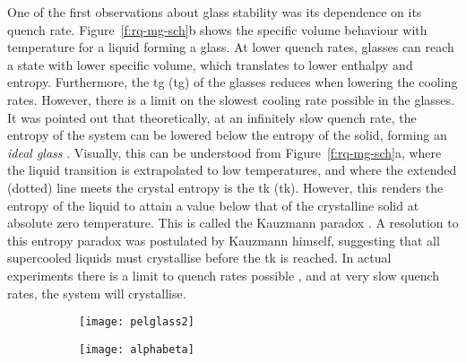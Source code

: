One of the first observations about glass stability was its dependence on its quench rate. Figure~\ref{f:rq-mg-sch}b shows the specific volume behaviour with temperature for a liquid forming a glass. At lower quench rates, glasses can reach a state with lower specific volume, which translates to lower enthalpy and entropy. Furthermore, the \glsdesc{tg} (\gls{tg}) of the glasses reduces when lowering the cooling rates. However, there is a limit on the slowest cooling rate possible in the glasses. It was pointed out that theoretically, at an infinitely slow quench rate, the entropy of the system can be lowered below the entropy of the solid, forming an \textit{ideal glass} \cite{Kauzmann1948}. Visually, this can be understood from Figure~\ref{f:rq-mg-sch}a, where the liquid transition is extrapolated to low temperatures, and where the extended (dotted) line meets the crystal entropy is the \glsdesc{tk} (\gls{tk}). However, this renders the entropy of the liquid to attain a value below that of the crystalline solid at absolute zero temperature. This is called the Kauzmann paradox \cite{Kauzmann1948,Debenedetti2001,Berthier2016}. A resolution to this entropy paradox was postulated by Kauzmann himself, suggesting that all supercooled liquids must crystallise before the \gls{tk} is reached. In actual experiments there is a limit to quench rates possible \cite{Kauzmann1948}, and at very slow quench rates, the system will crystallise. \par

\begin{figure}[!h]
	\begin{subfigure}{0.5\textwidth}
		\texttt{[image: pelglass2]}
		\subcaption{}
	\end{subfigure}%
	\begin{subfigure}{0.5\textwidth}
		\texttt{[image: alphabeta]}
		\subcaption{}
	\end{subfigure}
	\label{f:mgpel}
\end{figure}


